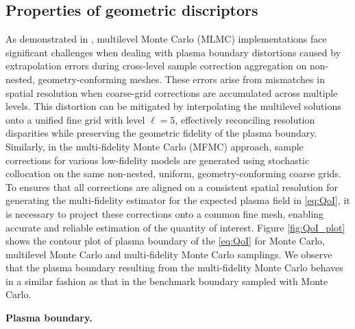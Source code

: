 \subsection{Properties of geometric discriptors}
As demonstrated in \cite{ElLiSa:2023}, multilevel Monte Carlo (MLMC) implementations face significant challenges when dealing with plasma boundary distortions caused by extrapolation errors during cross-level sample correction aggregation on non-nested, geometry-conforming meshes. These errors arise from mismatches in spatial resolution when coarse-grid corrections are accumulated across multiple levels. This distortion can be mitigated by interpolating the multilevel solutions onto a unified fine grid with level $\ell=5$, effectively reconciling resolution disparities while preserving the geometric fidelity of the plasma boundary. Similarly, in the multi-fidelity Monte Carlo (MFMC) approach, sample corrections for various low-fidelity models are generated using stochastic collocation on the same non-nested, uniform, geometry-conforming coarse grids. To ensures that all corrections are aligned on a consistent spatial resolution for generating the multi-fidelity estimator for the expected plasma field in \eqref{eq:QoI}, it is necessary to project these corrections onto a common fine mesh, enabling accurate and reliable estimation of the quantity of interest. Figure \ref{fig:QoI_plot} shows the contour plot of plasma boundary of the \eqref{eq:QoI} for Monte Carlo, multilevel Monte Carlo and multi-fidelity Monte Carlo samplings. We observe that the plasma boundary resulting from the multi-fidelity Monte Carlo behaves in a similar fashion as that in the benchmark boundary sampled with Monte Carlo.

\noindent \textbf{Plasma boundary.} 






